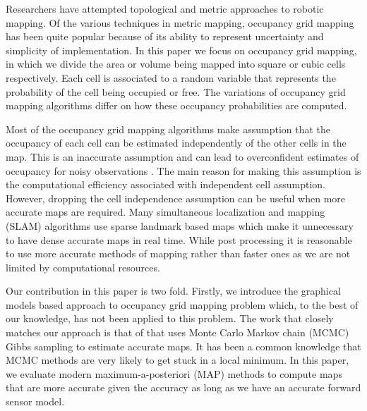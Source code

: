 \documentclass[letterpaper, 10 pt, conference]{ieeeconf} %
\begin{document}
Researchers have attempted topological and metric approaches to robotic mapping.
Of the various techniques in metric mapping, occupancy grid mapping has been
quite popular \cite{elfes1989using,moravec1988sensor} because of its ability
to represent uncertainty and simplicity of implementation.
In this paper we focus on occupancy grid mapping, in which we divide the area
or volume being mapped into square or cubic cells respectively. Each cell is
associated to a random variable that represents the probability of the cell
being occupied or free. The variations of occupancy grid mapping
algorithms differ on how these occupancy probabilities are computed.

Most of the occupancy grid mapping algorithms 
make assumption that the occupancy of each cell can be estimated
independently of the other cells in the map.
This is an inaccurate assumption and can lead to overconfident estimates of
occupancy for noisy observations \cite{thrun2003learning,merali2013icra}. The
main reason for making this assumption is the computational efficiency
associated with independent cell assumption.
However, dropping the cell independence assumption can be useful when
more accurate maps are required. 
Many simultaneous localization and mapping (SLAM) algorithms use
sparse landmark based maps which make it unnecessary to have dense accurate
maps in real time. 
While post processing it is reasonable to use more accurate methods of
mapping rather than faster ones as we are not limited by computational resources.

Our contribution in this paper is two fold. Firstly, we introduce the 
graphical models based approach to occupancy grid mapping problem
which, to the best of our knowledge, has not been applied to this problem. The
work that closely matches our approach is that of \cite{merali2013icra} that
uses Monte Carlo Markov chain (MCMC) Gibbs sampling to estimate accurate maps.
It has been a common knowledge that MCMC methods are very likely to get stuck
in a local minimum. In this paper, we evaluate modern maximum-a-posteriori
(MAP) methods to compute maps that are more accurate given the accuracy as long
as we have an accurate forward sensor model. 
\end{document}
